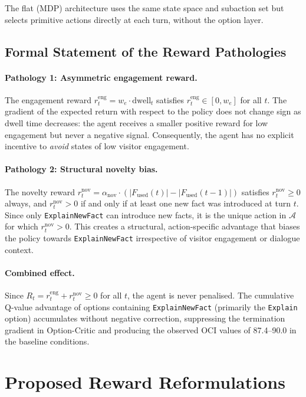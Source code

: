 \documentclass[12pt,a4paper]{article}
\newcommand{\reng}{r^{\mathrm{eng}}_t}
\newcommand{\rnov}{r^{\mathrm{nov}}_t}
\newcommand{\Fused}{F_{\mathrm{used}}}
\begin{document}
The flat (MDP) architecture uses the same state space and subaction set but selects primitive actions directly at each turn, without the option layer.

\subsection{Formal Statement of the Reward Pathologies}

\paragraph{Pathology 1: Asymmetric engagement reward.}
The engagement reward $\reng = w_e \cdot \mathrm{dwell}_t$ satisfies $\reng \in [0, w_e]$ for all $t$. The gradient of the expected return with respect to the policy does not change sign as dwell time decreases: the agent receives a smaller positive reward for low engagement but never a negative signal. Consequently, the agent has no explicit incentive to \emph{avoid} states of low visitor engagement.

\paragraph{Pathology 2: Structural novelty bias.}
The novelty reward $\rnov = \alpha_{\mathrm{nov}} \cdot (|\Fused(t)| - |\Fused(t-1)|)$ satisfies $\rnov \geq 0$ always, and $\rnov > 0$ if and only if at least one new fact was introduced at turn $t$. Since only \texttt{ExplainNewFact} can introduce new facts, it is the unique action in $\mathcal{A}$ for which $\rnov > 0$. This creates a structural, action-specific advantage that biases the policy towards \texttt{ExplainNewFact} irrespective of visitor engagement or dialogue context.

\paragraph{Combined effect.}
Since $R_t = \reng + \rnov \geq 0$ for all $t$, the agent is never penalised. The cumulative Q-value advantage of options containing \texttt{ExplainNewFact} (primarily the \texttt{Explain} option) accumulates without negative correction, suppressing the termination gradient in Option-Critic and producing the observed OCI values of 87.4--90.0 in the baseline conditions.

\section{Proposed Reward Reformulations}
\label{sec:reforms}
\end{document}
